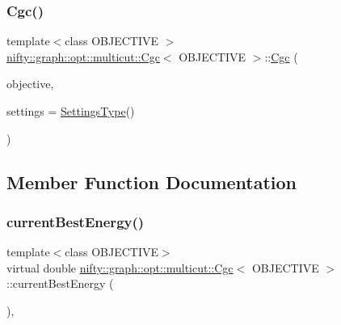 \mbox{\label{classnifty_1_1graph_1_1opt_1_1multicut_1_1Cgc_a5cd8c7c9c72d94cde40b57be5b167066}} 
\subsubsection{\texorpdfstring{Cgc()}{Cgc()}}
{\footnotesize\ttfamily template$<$class O\+B\+J\+E\+C\+T\+I\+VE $>$ \\
\hyperlink{classnifty_1_1graph_1_1opt_1_1multicut_1_1Cgc}{nifty\+::graph\+::opt\+::multicut\+::\+Cgc}$<$ O\+B\+J\+E\+C\+T\+I\+VE $>$\+::\hyperlink{classnifty_1_1graph_1_1opt_1_1multicut_1_1Cgc}{Cgc} (\begin{DoxyParamCaption}\item[{const \hyperlink{classnifty_1_1graph_1_1opt_1_1multicut_1_1Cgc_aa83ae7cd167c0580c61f1d4eab63eb9a}{Objective\+Type} \&}]{objective,  }\item[{const \hyperlink{structnifty_1_1graph_1_1opt_1_1multicut_1_1Cgc_1_1SettingsType}{Settings\+Type} \&}]{settings = {\ttfamily \hyperlink{structnifty_1_1graph_1_1opt_1_1multicut_1_1Cgc_1_1SettingsType}{Settings\+Type}()} }\end{DoxyParamCaption})}



\subsection{Member Function Documentation}
\mbox{\label{classnifty_1_1graph_1_1opt_1_1multicut_1_1Cgc_adecdb401bca97a45d76a162fc7c8df37}} 
\subsubsection{\texorpdfstring{current\+Best\+Energy()}{currentBestEnergy()}}
{\footnotesize\ttfamily template$<$class O\+B\+J\+E\+C\+T\+I\+VE$>$ \\
virtual double \hyperlink{classnifty_1_1graph_1_1opt_1_1multicut_1_1Cgc}{nifty\+::graph\+::opt\+::multicut\+::\+Cgc}$<$ O\+B\+J\+E\+C\+T\+I\+VE $>$\+::current\+Best\+Energy (\begin{DoxyParamCaption}{ }\end{DoxyParamCaption})\hspace{0.3cm}{\ttfamily [inline]}, {\ttfamily [virtual]}}



